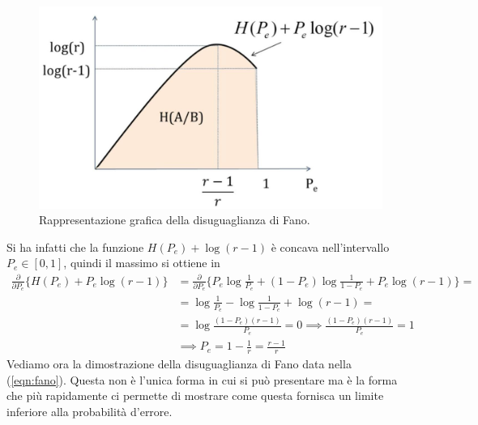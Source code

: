 \begin{figure}[H]
    \centering
    \includegraphics[scale=0.2]{img/fano.jpg}
    \caption{Rappresentazione grafica della disuguaglianza di Fano.}
\end{figure}
Si ha infatti che la funzione $H(P_e) + \log (r-1)$ \`e concava nell'intervallo $P_e \in [0, 1]$, quindi il massimo si ottiene in
\begin{align*}
    \frac{\partial}{\partial P_e} \Big \{ H(P_e) + P_e\log (r-1) \Big \} &= \frac{\partial}{\partial P_e} \Big \{ P_e \log \frac {1}{P_e} + (1-P_e) \log \frac{1}{1 - P_e} + P_e \log(r-1) \Big \} = \\
    &=\log \frac{1}{P_e} - \log \frac{1}{1-P_e} + \log (r-1) = \\
    &=\log \frac{(1-P_e)(r-1)}{P_e} = 0 \implies \frac{(1-P_e)(r-1)}{P_e} = 1 \\
    &\implies P_e = 1 - \frac{1}{r} = \frac{r-1}{r}
\end{align*}
\newline
Vediamo ora la dimostrazione della disuguaglianza di Fano data nella (\ref{eqn:fano}). Questa non \`e l'unica forma in cui si pu\`o presentare ma \`e la forma che pi\`u rapidamente ci permette di mostrare come questa fornisca un limite inferiore alla probabilità d'errore.
